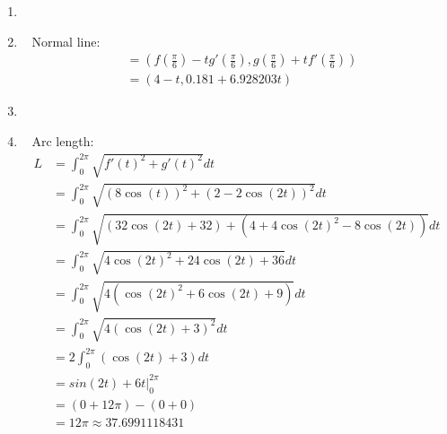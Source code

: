 \documentclass[11pt]{article}
\newcommand\Item[1][]{%
  \ifx\relax#1\relax  \item \else \item[#1] \fi
  \abovedisplayskip=0pt\abovedisplayshortskip=0pt~\vspace*{-\baselineskip}}
\begin{document}
\begin{enumerate}
\begin{enumerate}
              \Item %
              Normal line:
              \begin{align*}
                   & = \left( f(\frac{\pi}{6}) - tg'(\frac{\pi}{6}), g(\frac{\pi}{6}) + tf'(\frac{\pi}{6}) \right) \\
                   & = \left( 4 - t, 0.181 + 6.928203t \right)
              \end{align*}

              \Item %
              Arc length:
              \begin{align*}
                  L & = \int_{0}^{2\pi}\sqrt{f'\left(t\right)^{2}+g'\left(t\right)^{2}}dt                                                          \\
                    & = \int_{0}^{2\pi}\sqrt{\left(8\cos\left(t\right)\right)^{2}+\left(2-2\cos\left(2t\right)\right)^{2}}dt                       \\
                    & = \int_{0}^{2\pi}\sqrt{\left(32\cos\left(2t\right)+32\right)+\left(4+4\cos\left(2t\right)^{2}-8\cos\left(2t\right)\right)}dt \\
                    & = \int_{0}^{2\pi}\sqrt{4\cos\left(2t\right)^{2}+24\cos\left(2t\right)+36}dt                                                  \\
                    & = \int_{0}^{2\pi}\sqrt{4\left(\cos\left(2t\right)^{2}+6\cos\left(2t\right)+9\right)}dt                                       \\
                    & = \int_{0}^{2\pi}\sqrt{4\left(\cos\left(2t\right)+3\right)^{2}}dt                                                            \\
                    & = 2\int_{0}^{2\pi}\left(\cos\left(2t\right)+3\right)dt                                                                       \\
                    & = sin(2t) + 6t \Big|_0^{2\pi}                                                                                                \\
                    & = (0+12\pi) - (0+0)                                                                                                          \\
                    & = 12\pi \approx 37.6991118431
              \end{align*}


\end{enumerate}
\end{enumerate}
\end{document}
